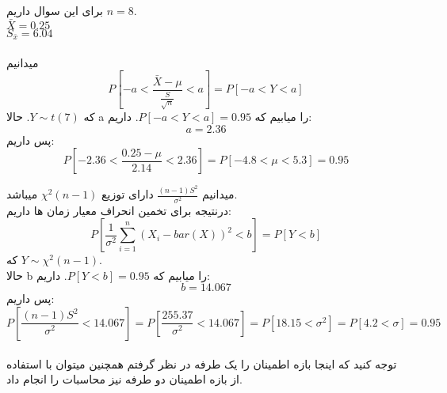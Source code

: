 \problem{}
برای این سوال داریم $n = 8$.\\
$\bar{X} = 0.25$\\
$S_{\bar{x}} = 6.04$\\\\
\subproblem{}
میدانیم 
\[
    P[-a<\frac{\bar{X}-\mu}{\frac{S}{\sqrt{n}}}<a] = P[-a<Y<a]    
\]
که $Y \sim t(7)$.
حالا a را میابیم که $P[-a<Y<a]  = 0.95$.
داریم:\\
\[a =2.36 \]
پس داریم:\\
\[ P[-2.36 <\frac{0.25-\mu}{2.14}< 2.36]
= P[-4.8 <\mu< 5.3]
= 0.95 \]

\subproblem{}
میدانیم 
$\frac{(n-1)S^2}{\sigma^2}$
دارای توزیع $\chi^2(n-1)$ میباشد.\\
درنتیجه برای تخمین انحراف معیار زمان ها داریم:\\
\[
    P[\frac{1}{\sigma^2}\sum_{i = 1}^{n}{(X_i-bar(X))^2}<b] = P[Y<b]    
\]
که $Y \sim \chi^2(n-1)$.\\
حالا b را میابیم که $P[Y<b]  = 0.95$.
داریم:\\
\[b = 14.067\]
پس داریم:\\
\[ P[\frac{(n-1)S^2}{\sigma^2} < 14.067] = 
P[\frac{255.37}{\sigma^2} < 14.067]=
P[18.15 < \sigma^2] = 
P[4.2 < \sigma]
=0.95 \]\\
توجه کنید که اینجا بازه اطمینان را یک طرفه در نظر گرفتم 
همچنین میتوان با استفاده از بازه اطمینان دو طرفه نیز محاسبات را انجام داد.